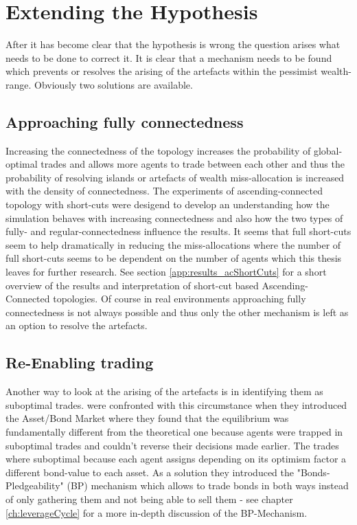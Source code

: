 \documentclass[Bachelorarbeit.tex]{subfiles}
\begin{document}
\section{Extending the Hypothesis}
After it has become clear that the hypothesis is wrong the question arises what needs to be done to correct it. It is clear that a mechanism needs to be found which prevents or resolves the arising of the artefacts within the pessimist wealth-range. Obviously two solutions are available.

\subsection{Approaching fully connectedness}
Increasing the connectedness of the topology increases the probability of global-optimal trades and allows more agents to trade between each other and thus the probability of resolving islands or artefacts of wealth miss-allocation is increased with the density of connectedness.
The experiments of ascending-connected topology with short-cuts were desigend to develop an understanding how the simulation behaves with increasing connectedness and also how the two types of  fully- and regular-connectedness influence the results.
It seems that full short-cuts seem to help dramatically in reducing the miss-allocations where the number of full short-cuts seems to be dependent on the number of agents which this thesis leaves for further research. See section \ref{app:results_acShortCuts} for a short overview of the results and interpretation of short-cut based Ascending-Connected topologies.
\linebreak
Of course in real environments approaching fully connectedness is not always possible and thus only the other mechanism is left as an option to resolve the artefacts.

\subsection{Re-Enabling trading}
\label{ch:interpretation_reenablingTrading}
Another way to look at the arising of the artefacts is in identifying them as suboptimal trades. \cite{Breuer2015} were confronted with this circumstance when they introduced the Asset/Bond Market where they found that the equilibrium was fundamentally different from the theoretical one because agents were trapped in suboptimal trades and couldn't reverse their decisions made earlier. The trades where suboptimal because each agent assigns depending on its optimism factor a different bond-value to each asset. As a solution they introduced the "Bonds-Pledgeability" (BP) mechanism which allows to trade bonds in both ways instead of only gathering them and not being able to sell them - see chapter \ref{ch:leverageCycle} for a more in-depth discussion of the BP-Mechanism.
\end{document}
